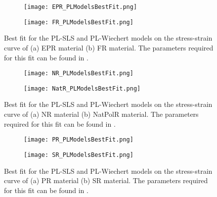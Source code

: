 \newpage
\begin{figure}[H]
	\centering
	\begin{subfigure}[b]{0.9\textwidth}
		\centering
		\texttt{[image: EPR\_PLModelsBestFit.png]}
		\caption{}
		\label{fig:BestFitEPR}
	\end{subfigure}
	\begin{subfigure}[b]{0.9\textwidth}
		\centering
		\texttt{[image: FR\_PLModelsBestFit.png]}
		\caption{}
		\label{fig:BestFitFR}
	\end{subfigure}
	\caption{Best fit for the PL-SLS and PL-Wiechert models on the stress-strain curve of (a) EPR material (b) FR material. The parameters required for this fit can be found in . }
	\label{fig:BestFitEPR_FR}
\end{figure}

\begin{figure}[H]
	\centering
	\begin{subfigure}[b]{0.9\textwidth}
		\centering
		\texttt{[image: NR\_PLModelsBestFit.png]}
		\caption{}
		\label{fig:BestFitNR}
	\end{subfigure}
	\begin{subfigure}[b]{0.9\textwidth}
		\centering
		\texttt{[image: NatR\_PLModelsBestFit.png]}
		\caption{}
		\label{fig:BestFitNatR}
	\end{subfigure}
	\caption{Best fit for the PL-SLS and PL-Wiechert models on the stress-strain curve of (a) NR material (b) NatPolR material. The parameters required for this fit can be found in . }
	\label{fig:BestFitNR_NatR}
\end{figure}

\begin{figure}[H]
	\centering
	\begin{subfigure}[b]{0.9\textwidth}
		\centering
		\texttt{[image: PR\_PLModelsBestFit.png]}
		\caption{}
		\label{fig:BestFitPR}
	\end{subfigure}
	\begin{subfigure}[b]{0.9\textwidth}
		\centering
		\texttt{[image: SR\_PLModelsBestFit.png]}
		\caption{}
		\label{fig:BestFitSR}
	\end{subfigure}
	\caption{Best fit for the PL-SLS and PL-Wiechert models on the stress-strain curve of (a) PR material (b) SR material. The parameters required for this fit can be found in .}
	\label{fig:BestFitPR_SR}
\end{figure}

